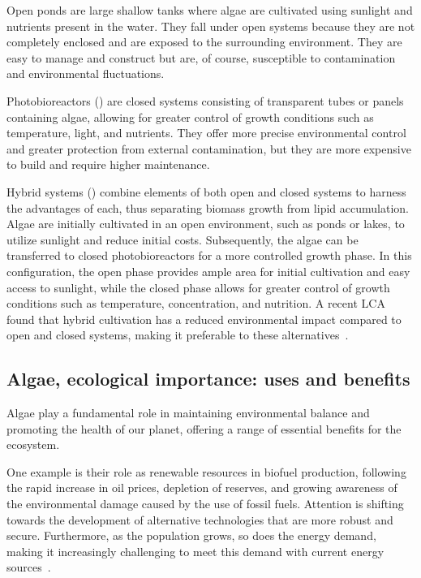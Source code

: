 Open ponds are large shallow tanks where algae are cultivated using sunlight and nutrients present in the water. They fall under open systems because they are not completely enclosed and are exposed to the surrounding environment. They are easy to manage and construct but are, of course, susceptible to contamination and environmental fluctuations.

Photobioreactors () are closed systems consisting of transparent tubes or panels containing algae, allowing for greater control of growth conditions such as temperature, light, and nutrients. They offer more precise environmental control and greater protection from external contamination, but they are more expensive to build and require higher maintenance.

Hybrid systems () combine elements of both open and closed systems to harness the advantages of each, thus separating biomass growth from lipid accumulation. Algae are initially cultivated in an open environment, such as ponds or lakes, to utilize sunlight and reduce initial costs. Subsequently, the algae can be transferred to closed photobioreactors for a more controlled growth phase. In this configuration, the open phase provides ample area for initial cultivation and easy access to sunlight, while the closed phase allows for greater control of growth conditions such as temperature,  concentration, and nutrition. A recent LCA found that hybrid cultivation has a reduced environmental impact compared to open and closed systems, making it preferable to these alternatives~\parencite{narala_Comparison_2016}.


\subsection{Algae, ecological importance: uses and benefits}
Algae play a fundamental role in maintaining environmental balance and promoting the health of our planet, offering a range of essential benefits for the ecosystem.

One example is their role as renewable resources in biofuel production, following the rapid increase in oil prices, depletion of reserves, and growing awareness of the environmental damage caused by the use of fossil fuels. Attention is shifting towards the development of alternative technologies that are more robust and secure. Furthermore, as the population grows, so does the energy demand, making it increasingly challenging to meet this demand with current energy sources~\parencite{faruk_role_2023}.


